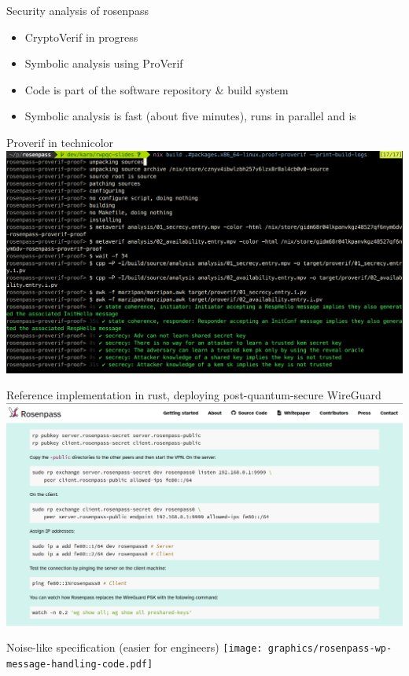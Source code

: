 \begin{frame}{Security analysis of rosenpass}
  \begin{itemize}
	\item CryptoVerif in progress
	\item Symbolic analysis using ProVerif
  \item Code is part of the software repository \& build system
  \item Symbolic analysis is fast (about five minutes), runs in parallel and is
  \end{itemize}
\end{frame}

\begin{frame}{Proverif in technicolor}
  \includegraphics[height=.9\textheight]{assets/2023-03-20-symbolic-analysis-screenshot.png}
\end{frame}

\begin{frame}{Reference implementation in rust, deploying post-quantum-secure WireGuard}
  \includegraphics[height=.9\textheight]{assets/2023-03-20-rg-tutorial-screenshot.png}
\end{frame}

\begin{frame}{Noise-like specification (easier for engineers)}
  \texttt{[image: graphics/rosenpass-wp-message-handling-code.pdf]}
\end{frame}
